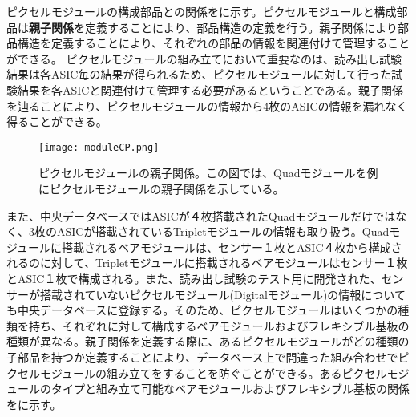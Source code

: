 ピクセルモジュールの構成部品との関係をに示す。ピクセルモジュールと構成部品は\textbf{親子関係}を定義することにより、部品構造の定義を行う。親子関係により部品構造を定義することにより、それぞれの部品の情報を関連付けて管理することができる。
ピクセルモジュールの組み立てにおいて重要なのは、読み出し試験結果は各ASIC毎の結果が得られるため、ピクセルモジュールに対して行った試験結果を各ASICと関連付けて管理する必要があるということである。親子関係を辿ることにより、ピクセルモジュールの情報から4枚のASICの情報を漏れなく得ることができる。
\begin{figure}[tbp]
  \centering
  \texttt{[image: moduleCP.png]}
  \caption[ピクセルモジュールの親子関係]{ピクセルモジュールの親子関係。この図では、Quadモジュールを例にピクセルモジュールの親子関係を示している。}
  \label{fig:moduleCP}
\end{figure}

また、中央データベースではASICが４枚搭載されたQuadモジュールだけではなく、3枚のASICが搭載されているTripletモジュールの情報も取り扱う。Quadモジュールに搭載されるベアモジュールは、センサー１枚とASIC４枚から構成されるのに対して、Tripletモジュールに搭載されるベアモジュールはセンサー１枚とASIC１枚で構成される。また、読み出し試験のテスト用に開発された、センサーが搭載されていないピクセルモジュール(Digitalモジュール)の情報についても中央データベースに登録する。そのため、ピクセルモジュールはいくつかの種類を持ち、それぞれに対して構成するベアモジュールおよびフレキシブル基板の種類が異なる。親子関係を定義する際に、あるピクセルモジュールがどの種類の子部品を持つか定義することにより、データベース上で間違った組み合わせでピクセルモジュールの組み立てをすることを防ぐことができる。あるピクセルモジュールのタイプと組み立て可能なベアモジュールおよびフレキシブル基板の関係をに示す。


